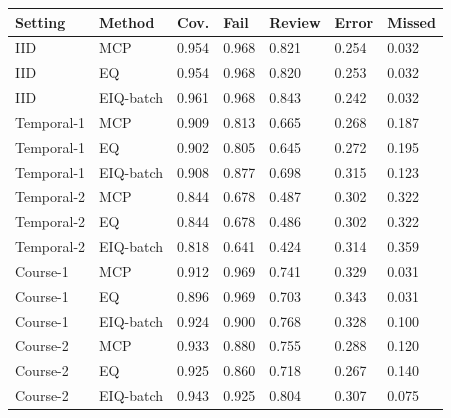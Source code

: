 \begin{tabular}{lllllll}
\toprule
Setting & Method & Cov. & Fail & Review & Error & Missed\\
\midrule
IID & MCP & 0.954 & 0.968 & 0.821 & 0.254 & 0.032\\
IID & EQ & 0.954 & 0.968 & 0.820 & 0.253 & 0.032\\
IID & EIQ-batch & 0.961 & 0.968 & 0.843 & 0.242 & 0.032\\
Temporal-1 & MCP & 0.909 & 0.813 & 0.665 & 0.268 & 0.187\\
Temporal-1 & EQ & 0.902 & 0.805 & 0.645 & 0.272 & 0.195\\
Temporal-1 & EIQ-batch & 0.908 & 0.877 & 0.698 & 0.315 & 0.123\\
Temporal-2 & MCP & 0.844 & 0.678 & 0.487 & 0.302 & 0.322\\
Temporal-2 & EQ & 0.844 & 0.678 & 0.486 & 0.302 & 0.322\\
Temporal-2 & EIQ-batch & 0.818 & 0.641 & 0.424 & 0.314 & 0.359\\
Course-1 & MCP & 0.912 & 0.969 & 0.741 & 0.329 & 0.031\\
Course-1 & EQ & 0.896 & 0.969 & 0.703 & 0.343 & 0.031\\
Course-1 & EIQ-batch & 0.924 & 0.900 & 0.768 & 0.328 & 0.100\\
Course-2 & MCP & 0.933 & 0.880 & 0.755 & 0.288 & 0.120\\
Course-2 & EQ & 0.925 & 0.860 & 0.718 & 0.267 & 0.140\\
Course-2 & EIQ-batch & 0.943 & 0.925 & 0.804 & 0.307 & 0.075\\
\bottomrule
\end{tabular}